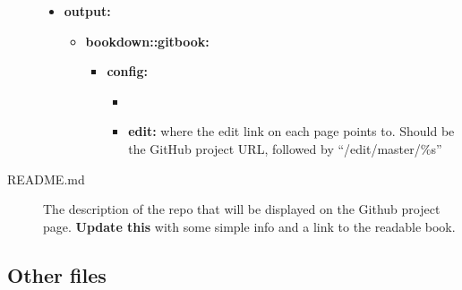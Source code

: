 \documentclass[
  english,
]{book}
\providecommand{\tightlist}{%
  \setlength{\itemsep}{0pt}\setlength{\parskip}{0pt}}
\begin{document}
\begin{description}
\begin{itemize}
\tightlist
\item
  \textbf{output:}

  \begin{itemize}
  \tightlist
  \item
    \textbf{bookdown::gitbook:}

    \begin{itemize}
    \tightlist
    \item
      \textbf{config:}

      \begin{itemize}
      \item
      \item
        \textbf{edit:} where the edit link on each page points to. Should be the GitHub project URL, followed by ``/edit/master/\%s''
      \end{itemize}
    \end{itemize}
  \end{itemize}
\end{itemize}
\item[README.md]
The description of the repo that will be displayed on the Github project page. \textbf{Update this} with some simple info and a link to the readable book.
\end{description}

\hypertarget{other-files}{%
\subsection{Other files}\label{other-files}}
\end{document}
